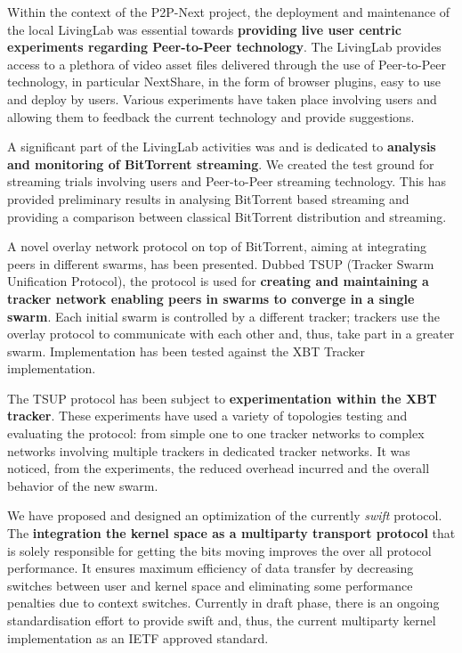 Within the context of the P2P-Next project, the deployment and maintenance of
the local LivingLab was essential towards \textbf{providing live user centric
experiments regarding Peer-to-Peer technology}. The LivingLab provides access
to a plethora of video asset files delivered through the use of Peer-to-Peer
technology, in particular NextShare, in the form of browser plugins, easy to
use and deploy by users. Various experiments have taken place involving users
and allowing them to feedback the current technology and provide suggestions.

A significant part of the LivingLab activities was and is dedicated to
\textbf{analysis and monitoring of BitTorrent streaming}. We created the test
ground for streaming trials involving users and Peer-to-Peer streaming
technology. This has provided preliminary results in analysing BitTorrent
based streaming and providing a comparison between classical BitTorrent
distribution and streaming.

A novel overlay network protocol on top of BitTorrent, aiming at integrating
peers in different swarms, has been presented. Dubbed TSUP (Tracker Swarm
Unification Protocol), the protocol is used for \textbf{creating and
maintaining a tracker network enabling peers in swarms to converge in a single
swarm}. Each initial swarm is controlled by a different tracker; trackers use
the overlay protocol to communicate with each other and, thus, take part in a
greater swarm. Implementation has been tested against the XBT Tracker
implementation.

The TSUP protocol has been subject to \textbf{experimentation within the XBT
tracker}. These experiments have used a variety of topologies testing and
evaluating the protocol: from simple one to one tracker networks to complex
networks involving multiple trackers in dedicated tracker networks. It was
noticed, from the experiments, the reduced overhead incurred and the overall
behavior of the new swarm.

We have proposed and designed an optimization of the currently \textit{swift}
protocol. The \textbf{integration the kernel space as a multiparty transport
protocol} that is solely responsible for getting the bits moving improves the
over all protocol performance. It ensures maximum efficiency of data transfer
by decreasing switches between user and kernel space and eliminating some
performance penalties due to context switches. Currently in draft phase,
there is an ongoing standardisation effort to provide swift and, thus, the
current multiparty kernel implementation as an IETF approved standard.

